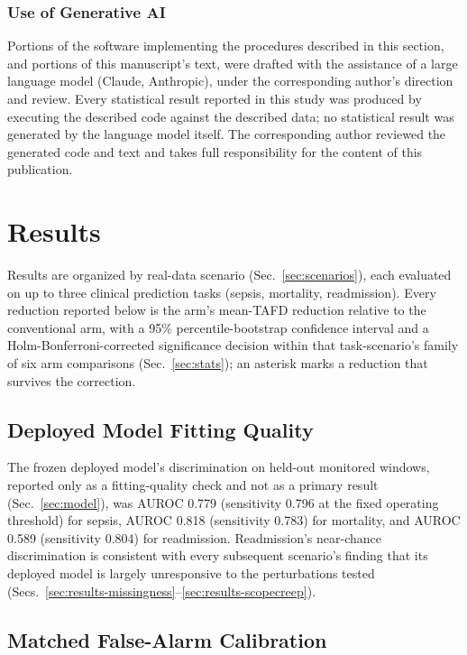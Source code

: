 \documentclass[preprintsapa,article,submit,oneauthor]{Definitions/mdpi}
\begin{document}
\subsubsection{Use of Generative AI}\label{sec:genai}

Portions of the software implementing the procedures described in this section, and portions of this manuscript's text, were drafted with the assistance of a large language model (Claude, Anthropic), under the corresponding author's direction and review. Every statistical result reported in this study was produced by executing the described code against the described data; no statistical result was generated by the language model itself. The corresponding author reviewed the generated code and text and takes full responsibility for the content of this publication.

\section{Results}

Results are organized by real-data scenario (Sec.~\ref{sec:scenarios}), each evaluated on up to three clinical prediction tasks (sepsis, mortality, readmission). Every reduction reported below is the arm's mean-TAFD reduction relative to the conventional arm, with a 95\% percentile-bootstrap confidence interval and a Holm-Bonferroni-corrected significance decision within that task-scenario's family of six arm comparisons (Sec.~\ref{sec:stats}); an asterisk marks a reduction that survives the correction.

\subsection{Deployed Model Fitting Quality}\label{sec:results-fitting}

The frozen deployed model's discrimination on held-out monitored windows, reported only as a fitting-quality check and not as a primary result (Sec.~\ref{sec:model}), was AUROC 0.779 (sensitivity 0.796 at the fixed operating threshold) for sepsis, AUROC 0.818 (sensitivity 0.783) for mortality, and AUROC 0.589 (sensitivity 0.804) for readmission. Readmission's near-chance discrimination is consistent with every subsequent scenario's finding that its deployed model is largely unresponsive to the perturbations tested (Secs.~\ref{sec:results-missingness}--\ref{sec:results-scopecreep}).

\subsection{Matched False-Alarm Calibration}
\end{document}
